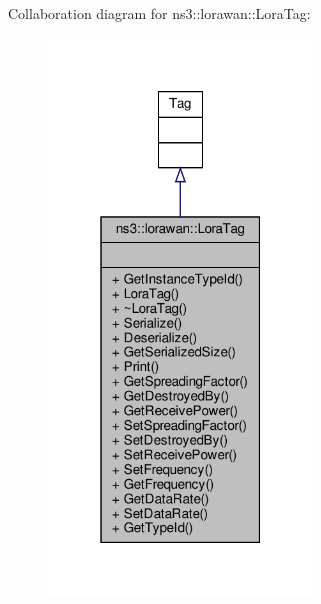 Collaboration diagram for ns3\+:\+:lorawan\+:\+:Lora\+Tag\+:
\nopagebreak
\begin{figure}[H]
\begin{center}
\leavevmode
\includegraphics[width=199pt]{classns3_1_1lorawan_1_1LoraTag__coll__graph}
\end{center}
\end{figure}
